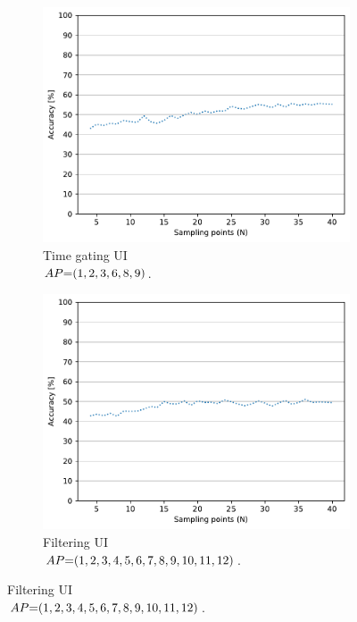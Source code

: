 \begin{figure}[ht]
  \begin{subfigure}{.49\textwidth}
    \centering
    \includegraphics[width=.99\linewidth]{Figures/RadarExperiments/Datasets/ThroughMaterials/Glass/samples-timegating-ui.pdf}
    \vspace{-15pt}
    \captionsetup{width=.99\linewidth}
    \caption{Time gating UI \\ $\splitatcommas{AP{=}(1, 2, 3, 6, 8, 9)}$.}
    \label{fig:radar-experiments:through-materials:glass-samples:timegating-ui}
  \end{subfigure}
  \begin{subfigure}{.49\textwidth}
    \centering
    \includegraphics[width=.99\linewidth]{Figures/RadarExperiments/Datasets/ThroughMaterials/Glass/samples-filtering-ui.pdf}  
    \vspace{-15pt}
    \captionsetup{width=.99\linewidth}
    \caption{Filtering UI \\ $\splitatcommas{AP{=}(1, 2, 3, 4, 5, 6, 7, 8, 9, 10, 11, 12)}$.}
    \label{fig:radar-experiments:through-materials:glass-samples:filtering-ui}
  \end{subfigure}


\end{figure}
